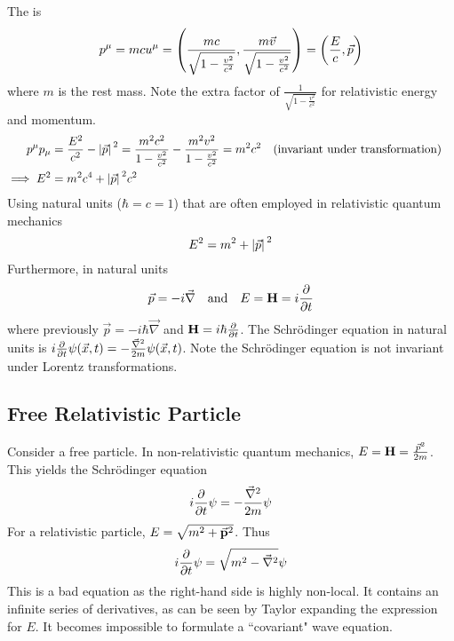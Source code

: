 \documentclass[12pt,a4paper,titlepage]{article}
\newcommand{\ul}[1]{\underline{\smash{#1}}} %
\begin{document}
The \ul{4-momentum} is
\begin{equation}
p^{\mu}=mcu^{\mu}=\qty(\frac{mc}{\sqrt{1-\frac{v^{2}}{c^{2}}}},\frac{m\vec{v}}{\sqrt{1-\frac{v^{2}}{c^{2}}}})=\qty(\frac{E}{c},\vec{p})
\end{equation}
where $m$ is the rest mass. Note the extra factor of $\frac{1}{\sqrt{1-\frac{v^{2}}{c^{2}}}}$ for relativistic energy and momentum.
\begin{equation}
\begin{aligned}
p^{\mu}p_{\mu}&=\frac{E^{2}}{c^{2}}-\abs*{\vec{p}}^{2}=\frac{m^{2}c^{2}}{1-\frac{v^{2}}{c^{2}}}-\frac{m^{2}v^{2}}{1-\frac{v^{2}}{c^{2}}}=m^{2}c^{2}\qq{(invariant under transformation)}\\
\implies E^{2}&=m^{2}c^{4}+\abs*{\vec{p}}^{2}c^{2}
\end{aligned}
\end{equation}
Using natural units ($\hbar=c=1$) that are often employed in relativistic quantum mechanics
\begin{equation}
E^{2}=m^{2}+\abs*{\vec{p}}^{2}
\end{equation}
Furthermore, in natural units
\begin{equation}
\vec{p}=-i\vec{\nabla}\qq{and}E=\vb{H}=i\pdv{t}
\end{equation}
where previously $\vec{p}=-i\hbar\vec{\nabla}$ and $\vb{H}=i\hbar\pdv{t}$. The Schr\"{o}dinger equation in natural units is $i\pdv{t}\psi(\vec{x},t)=-\frac{\vec{\nabla}^{2}}{2m}\psi(\vec{x},t)$. Note the Schr\"{o}dinger equation is not invariant under Lorentz transformations.

\subsection{Free Relativistic Particle}
Consider a free particle. In non-relativistic quantum mechanics, $E=\vb{H}=\frac{\vec{p}^{2}}{2m}$. This yields the Schr\"{o}dinger equation
\begin{equation}
i\pdv{t}\psi=-\frac{\vec{\nabla}^{2}}{2m}\psi
\end{equation}
For a relativistic particle, $E=\sqrt{m^{2}+\vec{\vb{p}}^{2}}$. Thus
\begin{equation}
i\pdv{t}\psi=\sqrt{m^{2}-\vec{\nabla}^{2}}\psi
\end{equation}
This is a bad equation as the right-hand side is highly non-local. It contains an infinite series of derivatives, as can be seen by Taylor expanding the expression for $E$. It becomes impossible to formulate a ``covariant" wave equation.\\
\end{document}
